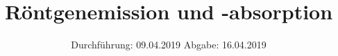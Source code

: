 

\subject{V602}
\title{Röntgenemission und -absorption}
\date{%
Durchführung: {09.04.2019}
\hspace{3em}
Abgabe: {16.04.2019}
}



\maketitle
\thispagestyle{empty}
\tableofcontents
\newpage





\printbibliography{}

